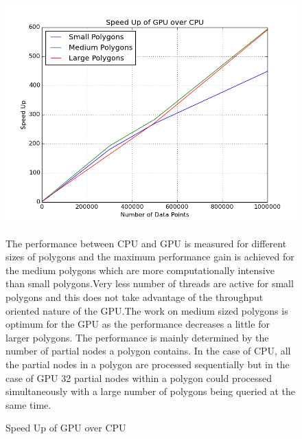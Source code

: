 \documentclass{article}
\begin{document}
\begin{figure}[ht]
\caption{Speed Up of GPU over CPU}
\includegraphics[scale=0.5]{SpeedUp}

The performance between CPU and GPU is measured for different sizes of polygons and the maximum performance gain is achieved for the medium polygons which are more computationally intensive than small polygons.Very less number of threads are active for small polygons  and this does not take advantage of the throughput oriented nature of the GPU.The work on medium sized polygons is optimum for the GPU as the performance decreases a little  for larger polygons.
The performance is mainly determined by the number of partial nodes a polygon contains. In the case of CPU, all the partial nodes in a polygon are processed sequentially but in the case of GPU 32 partial nodes within a polygon could processed simultaneously with a large number of polygons being queried at the same time.

\end{figure}
\end{document}
